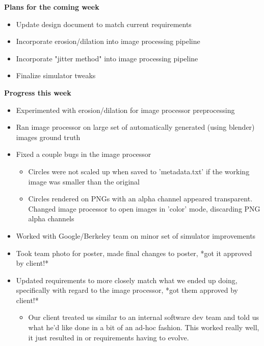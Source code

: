\documentclass[10pt, onecolumn, draftclsnofoot, letterpaper, compsoc]{IEEEtran}
\begin{document}
    \noindent \textbf{Plans for the coming week}

    \begin{itemize}

    \item Update design document to match current requirements
    \item Incorporate erosion/dilation into image processing pipeline
    \item Incorporate "jitter method" into image processing pipeline
    \item Finalize simulator tweaks

    \end{itemize}

    \noindent \textbf{Progress this week}

    \begin{itemize}

    \item Experimented with erosion/dilation for image processor preprocessing
    \item Ran image processor on large set of automatically generated (using blender) images ground truth
    \item Fixed a couple bugs in the image processor
    \begin{itemize}
      \item Circles were not scaled up when saved to 'metadata.txt' if the working image was smaller than the original
      \item Circles rendered on PNGs with an alpha channel appeared transparent. Changed image processor to open images in 'color' mode, discarding PNG alpha channels
    \end{itemize}

    \item Worked with Google/Berkeley team on minor set of simulator improvements
    \item Took team photo for poster, made final changes to poster, *got it approved by client!*
    \item Updated requirements to more closely match what we ended up doing, specifically with regard to the image processor, *got them approved by client!*
    \begin{itemize}
      \item Our client treated us similar to an internal software dev team and told us what he'd like done in a bit of an ad-hoc fashion. This worked really well, it just resulted in or requirements having to evolve.
    \end{itemize}

    \end{itemize}
\end{document}
